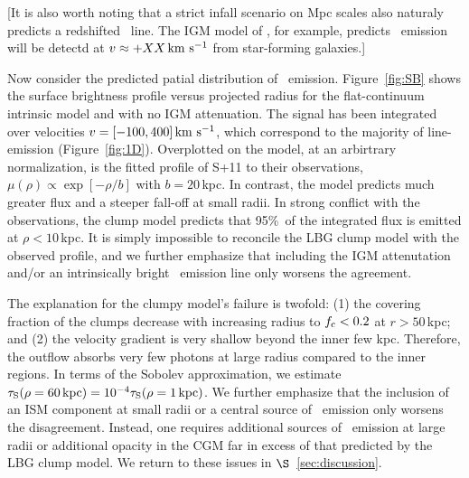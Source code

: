 \documentclass[12pt,preprint]{aastex}
\begin{document}

[It is also worth noting that a strict infall scenario on Mpc scales
also naturaly predicts a redshifted \lya\ line.  The IGM model of
\cite{zheng+10}, for example, predicts \lya\ emission will be detectd
at $v \approx +XX \, {\rm km~s^{-1}}$ from star-forming galaxies.]


Now consider the predicted patial distribution of \lya\ emission.
Figure~\ref{fig:SB} shows the surface brightness profile
versus projected radius for the flat-continuum intrinsic model and with
no IGM attenuation.  The signal has been integrated over velocities $v =
[-100,400]\, {\rm km~s^{-1}}$, which correspond to the majority of line-emission
(Figure~\ref{fig:1D}).
Overplotted on the model, at an arbirtrary
normalization, is the fitted profile of S+11 to their observations,
$\mu(\rho) \propto \exp[-\rho/b]$ with $b=20$\,kpc.  
In contrast, the model
predicts much greater flux and a steeper fall-off at small radii.
In strong conflict with
the observations, the clump model predicts that 95\%\ of the
integrated flux is emitted at $\rho < 10$\,kpc.  
It is simply impossible to reconcile the LBG clump model with the
observed profile, and we further emphasize that including the IGM
attenutation and/or an intrinsically bright \lya\ emission line only
worsens the agreement.

The explanation for the clumpy model's failure is twofold:  
(1) the covering fraction of the clumps decrease with increasing radius to
$f_{\rm c} < 0.2$ at $r > 50$\,kpc; and
(2) the velocity gradient is very shallow beyond the inner few kpc. Therefore,
the outflow absorbs very few photons at large radius compared to the
inner regions.  In terms of the Sobolev approximation, we estimate
$\tau_{\rm S}(\rho = 60 \, {\rm kpc}) = 10^{-4} \tau_{\rm S}(\rho=1\, {\rm
  kpc})$.  
We further emphasize that the inclusion of an ISM
component at small radii or a central source of \lya\ emission only
worsens the disagreement. 
Instead, one requires additional sources of \lya\ emission at large
radii or additional opacity in the CGM far in excess of that predicted by
the LBG clump model.  We return to these issues in
$\S$~\ref{sec:discussion}.
\end{document}
